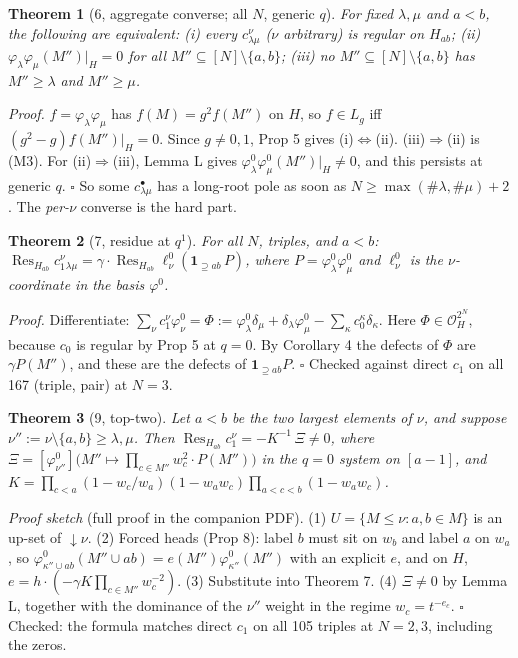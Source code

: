 \documentclass[10pt]{article}
\newcommand{\Res}{\operatorname{Res}}
\theoremstyle{plain}
\newtheorem*{thm}{Theorem}
\begin{document}
\begin{thm}[6, aggregate converse; all $N$, generic $q$]
For fixed $\lambda,\mu$ and $a<b$, the following are equivalent:
(i) every $c^\nu_{\lambda\mu}$ ($\nu$ arbitrary) is regular on $H_{ab}$;
(ii) $\varphi_\lambda\varphi_\mu(M'')|_H=0$ for all $M''\subseteq[N]\setminus\{a,b\}$;
(iii) no $M''\subseteq[N]\setminus\{a,b\}$ has $M''\ge\lambda$ and $M''\ge\mu$.
\end{thm}
\emph{Proof.} $f=\varphi_\lambda\varphi_\mu$ has $f(M)=g^2f(M'')$ on $H$, so $f\in L_g$ iff $(g^2-g)f(M'')|_H=0$. Since $g\ne0,1$, Prop 5 gives
(i)$\Leftrightarrow$(ii). (iii)$\Rightarrow$(ii) is (M3). For (ii)$\Rightarrow$(iii), Lemma L gives $\varphi^0_\lambda\varphi^0_\mu(M'')|_H\ne0$, and this
persists at generic $q$. $\square$
So some $c^\bullet_{\lambda\mu}$ has a long-root pole as soon as $N\ge\max(\#\lambda,\#\mu)+2$. The \emph{per-$\nu$} converse is the hard part.

\begin{thm}[7, residue at $q^1$]
For all $N$, triples, and $a<b$:\quad $\Res_{H_{ab}}c_1^\nu{}_{\lambda\mu}=\gamma\cdot\Res_{H_{ab}}\ell^0_\nu(\mathbf 1_{\supseteq ab}\,P)$, where
$P=\varphi^0_\lambda\varphi^0_\mu$ and $\ell^0_\nu$ is the $\nu$-coordinate in the basis $\varphi^0$.
\end{thm}
\emph{Proof.} Differentiate: $\sum_\nu c_1^\nu\varphi^0_\nu=\Phi:=\varphi^0_\lambda\delta_\mu+\delta_\lambda\varphi^0_\mu-\sum_\kappa c_0^\kappa\delta_\kappa$.
Here $\Phi\in\mathcal O_H^{2^N}$, because $c_0$ is regular by Prop 5 at $q=0$. By Corollary 4 the defects of $\Phi$ are $\gamma P(M'')$, and these are the
defects of $\mathbf 1_{\supseteq ab}P$. $\square$
Checked against direct $c_1$ on all 167 (triple, pair) at $N=3$.

\begin{thm}[9, top-two]
Let $a<b$ be the two largest elements of $\nu$, and suppose $\nu'':=\nu\setminus\{a,b\}\ge\lambda,\mu$. Then
$\Res_{H_{ab}}c_1^\nu=-K^{-1}\,\Xi\neq0$, where $\Xi=[\varphi^0_{\nu''}]\bigl(M''\mapsto\prod_{c\in M''}w_c^2\cdot P(M'')\bigr)$ in the $q=0$ system on
$[a-1]$, and $K=\prod_{c<a}(1-w_c/w_a)(1-w_aw_c)\prod_{a<c<b}(1-w_aw_c)$.
\end{thm}
\emph{Proof sketch} (full proof in the companion PDF). (1) $U=\{M\le\nu: a,b\in M\}$ is an up-set of ${\downarrow}\nu$. (2) Forced heads (Prop 8): label $b$ must
sit on $w_b$ and label $a$ on $w_a$, so $\varphi^0_{\kappa''\cup ab}(M''\cup ab)=e(M'')\varphi^0_{\kappa''}(M'')$ with an explicit $e$, and on $H$,
$e=h\cdot(-\gamma K\prod_{c\in M''}w_c^{-2})$. (3) Substitute into Theorem 7. (4) $\Xi\ne0$ by Lemma L, together with the dominance of the $\nu''$ weight in
the regime $w_c=t^{-e_c}$. $\square$
Checked: the formula matches direct $c_1$ on all 105 triples at $N=2,3$, including the zeros.
\end{document}
